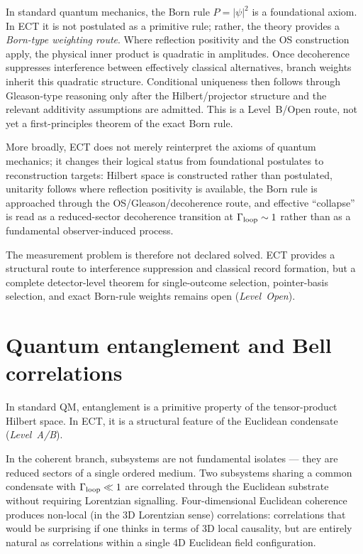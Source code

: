 \documentclass[11pt,a4paper]{article}
\begin{document}
In standard quantum mechanics, the Born rule $P=|\psi|^2$ is a foundational axiom. In ECT it is not postulated as a primitive rule; rather, the theory provides a \emph{Born-type weighting route}. Where reflection positivity and the OS construction apply, the physical inner product is quadratic in amplitudes. Once decoherence suppresses interference between effectively classical alternatives, branch weights inherit this quadratic structure. Conditional uniqueness then follows through Gleason-type reasoning only after the Hilbert/projector structure and the relevant additivity assumptions are admitted. This is a Level~B/Open route, not yet a first-principles theorem of the exact Born rule.

More broadly, ECT does not merely reinterpret the axioms of quantum mechanics; it changes their logical status from foundational postulates to reconstruction targets: Hilbert space is constructed rather than postulated, unitarity follows where reflection positivity is available, the Born rule is approached through the OS/Gleason/decoherence route, and effective ``collapse'' is read as a reduced-sector decoherence transition at $\Gamma_{\rm loop}\sim 1$ rather than as a fundamental observer-induced process.

The measurement problem is therefore not declared solved. ECT provides a structural route to interference suppression and classical record formation, but a complete detector-level theorem for single-outcome selection, pointer-basis selection, and exact Born-rule weights remains open (\emph{Level~Open}).


\section{Quantum entanglement and Bell correlations}
\label{sec:pop_entanglement}

In standard QM, entanglement is a primitive property of the tensor-product Hilbert space. In ECT, it is a structural feature of the Euclidean condensate (\emph{Level~A/B}).

In the coherent branch, subsystems are not fundamental isolates --- they are reduced sectors of a single ordered medium. Two subsystems sharing a common condensate with $\Gamma_{\rm loop} \ll 1$ are correlated through the Euclidean substrate without requiring Lorentzian signalling. Four-dimensional Euclidean coherence produces non-local (in the 3D Lorentzian sense) correlations: correlations that would be surprising if one thinks in terms of 3D local causality, but are entirely natural as correlations within a single 4D Euclidean field configuration.
\end{document}
